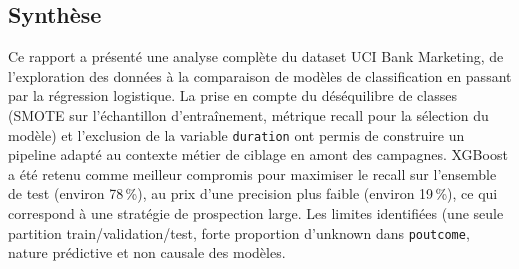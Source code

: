 \documentclass[11pt,a4paper]{article}
\begin{document}
\subsection{Synthèse}
Ce rapport a présenté une analyse complète du dataset UCI Bank Marketing, de l'exploration des données à la comparaison de modèles de classification en passant par la régression logistique. La prise en compte du déséquilibre de classes (SMOTE sur l'échantillon d'entraînement, métrique recall pour la sélection du modèle) et l'exclusion de la variable \texttt{duration} ont permis de construire un pipeline adapté au contexte métier de ciblage en amont des campagnes. XGBoost a été retenu comme meilleur compromis pour maximiser le recall sur l'ensemble de test (environ 78\,\%), au prix d'une precision plus faible (environ 19\,\%), ce qui correspond à une stratégie de prospection large. Les limites identifiées (une seule partition train/validation/test, forte proportion d'unknown dans \texttt{poutcome}, nature prédictive et non causale des modèles.
\end{document}
